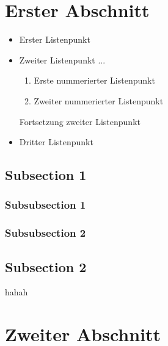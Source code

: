 
\section{Erster Abschnitt}

\begin{itemize}

	\item Erster Listenpunkt

	\item Zweiter Listenpunkt ...
   
    \begin{enumerate}

		\item Erste nummerierter Listenpunkt
		
		\item Zweiter nummerierter Listenpunkt

	\end{enumerate}
	
	Fortsetzung zweiter Listenpunkt
	
	\item Dritter Listenpunkt

\end{itemize}


\subsection{Subsection 1}

\subsubsection{Subsubsection 1}


\subsubsection{Subsubsection 2}

\subsection{Subsection 2}
 hahah

\section{Zweiter Abschnitt}

